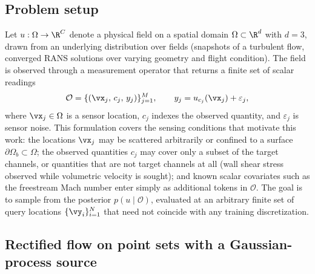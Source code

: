 \documentclass{article} %
\begin{document}
\subsection{Problem setup}
\label{sec:method-setup}

Let $u:\Omega\to\R^{C}$ denote a physical field on a spatial domain $\Omega\subset\R^{d}$ with $d=3$, drawn from an underlying distribution over fields (snapshots of a turbulent flow, converged RANS solutions over varying geometry and flight condition). The field is observed through a measurement operator that returns a finite set of scalar readings
\begin{equation}
\mathcal{O}=\{(\vx_j,\,c_j,\,y_j)\}_{j=1}^{M},\qquad y_j = u_{c_j}(\vx_j)+\varepsilon_j,
\label{eq:obs}
\end{equation}
where $\vx_j\in\Omega$ is a sensor location, $c_j$ indexes the observed quantity, and $\varepsilon_j$ is sensor noise. This formulation covers the sensing conditions that motivate this work: the locations $\vx_j$ may be scattered arbitrarily or confined to a surface $\partial\Omega_b\subset\Omega$; the observed quantities $c_j$ may cover only a subset of the target channels, or quantities that are not target channels at all (wall shear stress observed while volumetric velocity is sought); and known scalar covariates such as the freestream Mach number enter simply as additional tokens in $\mathcal{O}$. The goal is to sample from the posterior $p(u\mid\mathcal{O})$, evaluated at an arbitrary finite set of query locations $\{\vy_i\}_{i=1}^{N}$ that need not coincide with any training discretization.

\subsection{Rectified flow on point sets with a Gaussian-process source}
\label{sec:method-flow}
\end{document}

